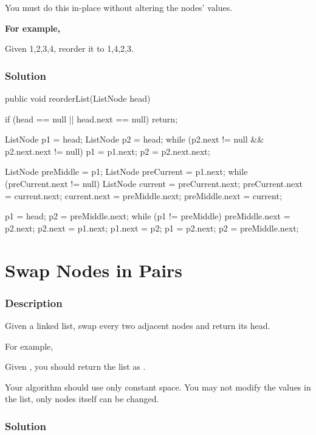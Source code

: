 You must do this in-place without altering the nodes' values.

\textbf{For example,}

Given {1,2,3,4}, reorder it to {1,4,2,3}.

\subsubsection{Solution}

\begin{Code}
public void reorderList(ListNode head) {
    if (head == null || head.next == null) return;

    ListNode p1 = head;
    ListNode p2 = head;
    while (p2.next != null && p2.next.next != null) {
        p1 = p1.next;
        p2 = p2.next.next;
    }

    ListNode preMiddle = p1;
    ListNode preCurrent = p1.next;
    while (preCurrent.next != null) {
        ListNode current = preCurrent.next;
        preCurrent.next = current.next;
        current.next = preMiddle.next;
        preMiddle.next = current;
    }

    p1 = head;
    p2 = preMiddle.next;
    while (p1 != preMiddle) {
        preMiddle.next = p2.next;
        p2.next = p1.next;
        p1.next = p2;
        p1 = p2.next;
        p2 = preMiddle.next;
    }
}
\end{Code}

\newpage

\section{Swap Nodes in Pairs} %

\subsubsection{Description}
Given a linked list, swap every two adjacent nodes and return its head.

For example,

Given , you should return the list as .

Your algorithm should use only constant space. You may not modify the values in the list, only nodes itself can be changed.

\subsubsection{Solution}

